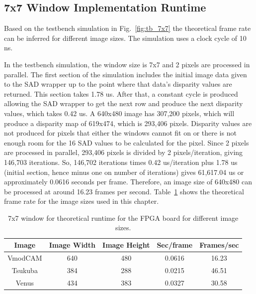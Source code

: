 \subsection{7x7 Window Implementation Runtime}
\label{sec:testbench7x7}

Based on the testbench simulation in Fig.~\ref{fig:tb_7x7} the theoretical frame rate can be inferred for different image sizes. The simulation uses a clock cycle of 10 ns.

In the testbench simulation, the window size is 7x7 and 2 pixels are processed in parallel. The first section of the simulation includes the initial image data given to the SAD wrapper up to the point where that data's disparity values are returned. This section takes 1.78 us. After that, a constant cycle is produced allowing the SAD wrapper to get the next row and produce the next disparity values, which takes 0.42 us. A 640x480 image has 307,200 pixels, which will produce a disparity map of 619x474, which is 293,406 pixels. Disparity values are not produced for pixels that either the windows cannot fit on or there is not enough room for the 16 SAD values to be calculated for the pixel. Since 2 pixels are processed in parallel, 293,406 pixels is divided by 2 pixels/iteration, giving 146,703 iterations. So, 146,702 iterations times 0.42 us/iteration plus 1.78 us (initial section, hence minus one on number of iterations) gives 61,617.04 us or approximately 0.0616 seconds per frame. Therefore, an image size of 640x480 can be processed at around 16.23 frames per second. Table~\ref{table:tb_7x7} shows the theoretical frame rate for the image sizes used in this chapter.


\begin{table}
	\begin{center}
		\begin{tabular}{|c|c|c|c|c|}
			\hline
				\rowstyle{\bfseries} Image & 
				\rowstyle{\bfseries} Image Width & 
				\rowstyle{\bfseries} Image Height & 
				\rowstyle{\bfseries} Sec/frame & 
				\rowstyle{\bfseries} Frames/sec
			\\ \hline 
			VmodCAM & 640 & 480 & 0.0616 & 16.23
			\\ \hline 
			Tsukuba & 384 & 288 & 0.0215 & 46.51
			\\ \hline 
			Venus & 434 & 383 & 0.0327 & 30.58
			\\ \hline 
		\end{tabular}	
		\captionfonts
		\caption{7x7 window for theoretical runtime for the FPGA board for different image sizes.}
		\label{table:tb_7x7}
	\end{center}
\end{table}

